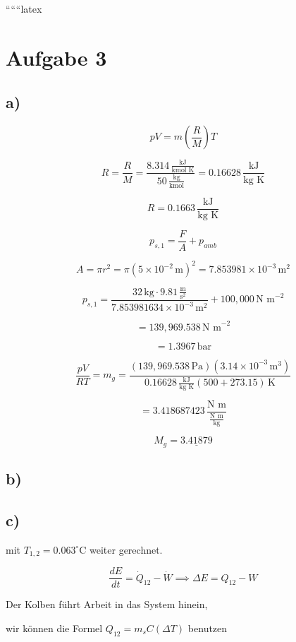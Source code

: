 
``````latex


\section*{Aufgabe 3}

\subsection*{a)}

\[
pV = m \left( \frac{R}{M} \right) T
\]

\[
R = \frac{R}{M} = \frac{8.314 \, \frac{\text{kJ}}{\text{kmol K}}}{50 \, \frac{\text{kg}}{\text{kmol}}} = 0.16628 \, \frac{\text{kJ}}{\text{kg K}}
\]

\[
R = 0.1663 \, \frac{\text{kJ}}{\text{kg K}}
\]

\[
p_{s,1} = \frac{F}{A} + p_{amb}
\]

\[
A = \pi r^2 = \pi (5 \times 10^{-2} \, \text{m})^2 = 7.853981 \times 10^{-3} \, \text{m}^2
\]

\[
p_{s,1} = \frac{32 \, \text{kg} \cdot 9.81 \, \frac{\text{m}}{\text{s}^2}}{7.853981634 \times 10^{-3} \, \text{m}^2} + 100,000 \, \text{N m}^{-2}
\]

\[
= 139,969.538 \, \text{N m}^{-2}
\]

\[
= 1.3967 \, \text{bar}
\]

\[
\frac{pV}{RT} = m_g = \frac{(139,969.538 \, \text{Pa}) (3.14 \times 10^{-3} \, \text{m}^3)}{0.16628 \, \frac{\text{kJ}}{\text{kg K}} (500 + 273.15) \, \text{K}}
\]

\[
= 3.418687423 \, \frac{\text{N m}}{\frac{\text{N m}}{\text{kg}}}
\]

\[
M_g = \underline{3.41879}
\]

\subsection*{b)}

\subsection*{c)}

mit $T_{1,2} = 0.063^\circ \text{C}$ weiter gerechnet.

\[
\frac{dE}{dt} = \dot{Q}_{12} - \dot{W} \implies \Delta E = Q_{12} - W
\]

Der Kolben führt Arbeit in das System hinein,

wir können die Formel $Q_{12} = m_s C (\Delta T)$ benutzen

